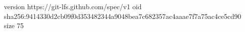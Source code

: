 version https://git-lfs.github.com/spec/v1
oid sha256:9414330d2cb09f0d353482344a9048bea7c682357ac4aaae7f7a75ac4ce5cd90
size 75
